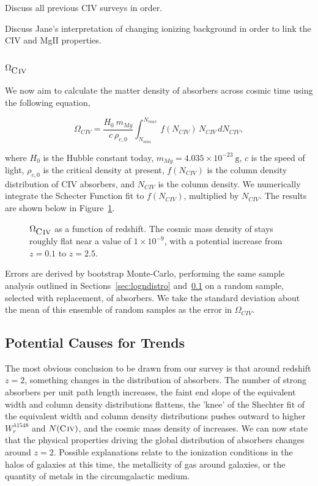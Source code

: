 \documentclass[linenumbers,twocolumn]{aastex61}
\begin{document}
Discuss all previous CIV surveys in order.

Discuss Jane's interpretation of changing ionizing background in order to link the CIV and MgII properties.

\subsection{$\Omega_{\hbox{{\rm C}\kern 0.1em{\sc iv}}}$}
\label{omegaciv}

We now aim to calculate the matter density of {\CIV} absorbers across cosmic time using the following equation,

\begin{equation}
\Omega_{CIV} = \frac{H_0\  m_{Mg}}{c\ \rho_{c,0}} \int_{N_{min}}^{N_{max}}\, f (N_{CIV})\, N_{CIV}\, dN_{CIV} ,
\label{eqn:omega}
\end{equation}

where $H_0$ is the Hubble constant today, $m_{Mg} = 4.035 \times 10^{-23}~\mathrm{g}$, $c$ is the speed of light, $\rho_{c,0}$ is the critical density at present, $f(N_{CIV})$ is the column density distribution of {CIV} absorbers, and $N_{CIV}$ is the column density. We numerically integrate the Schecter Function fit to $f(N_{CIV})$, multiplied by $N_{CIV}$. The results are shown below in Figure~\ref{fig:omegamgii}.

\begin{figure*}[bth]
\caption{$\Omega_{\hbox{{\rm C}\kern 0.1em{\sc iv}}}$ as a function of redshift. The cosmic mass density of {\CIV} stays roughly flat near a value of $1 \times 10^{-9}$, with a potential increase from $z = 0.1$ to $z = 2.5$.}
\label{fig:omegamgii}
\end{figure*}

Errors are derived by bootstrap Monte-Carlo, performing the same sample analysis outlined in Sections~\ref{sec:logndistro} and~\ref{omegaciv} on a random sample, selected with replacement, of {\CIV} absorbers.  We take the standard deviation about the mean of this ensemble of random samples as the error in $\Omega_{CIV}$.

\subsection{Potential Causes for Trends}
\label{trendcauses}

The most obvious conclusion to be drawn from our {\CIV} survey is that around redshift $z = 2$, something changes in the distribution of {\CIV} absorbers. The number of strong absorbers per unit path length increases, the faint end slope of the equivalent width and column density distributions flattens, the 'knee' of the Shechter fit of the equivalent width and column density distributions pushes outward to higher $W_r^{\lambda1548}$ and $N(\hbox{{\rm C}\kern 0.1em{\sc iv}})$, and the cosmic mass density of {\CIV} increases. We can now state that the physical properties driving the global distribution of {\CIV} absorbers changes around $z = 2$. Possible explanations relate to the ionization conditions in the halos of galaxies at this time, the metallicity of gas around galaxies, or the quantity of metals in the circumgalactic medium.
\end{document}
